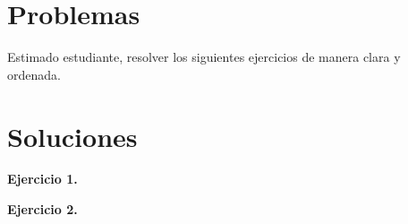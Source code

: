 \section*{\large Problemas}

Estimado estudiante, resolver los siguientes ejercicios de manera clara y ordenada.

\begin{exercise}
\end{exercise}

\begin{exercise}
\end{exercise}

\newpage

\section*{\large Soluciones}
{
    \textbf{Ejercicio 1.}

    \textbf{Ejercicio 2.}
}\label{sec:soluciones}
